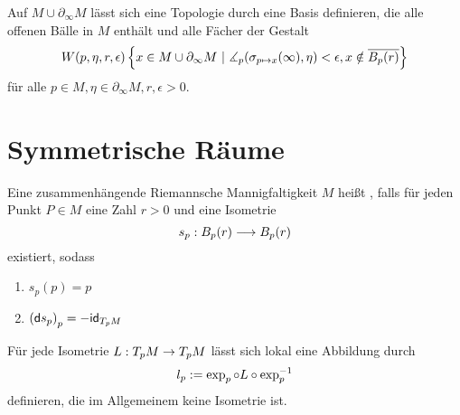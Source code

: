 \documentclass{book}
\renewcommand{\d}{\textsf{d}}
\renewcommand{\l}[1]{\overline{#1}}
\begin{document}
\Bem{}
Auf $M\cup \partial_\infty M$ lässt sich eine Topologie durch eine Basis definieren, die alle offenen Bälle in $M$ enthält und alle Fächer der Gestalt
\[ W(p,\eta, r, \epsilon)\set{x \in M \cup \partial_\infty M}{ \measuredangle_p(\sigma_{p\mapsto x}(\infty), \eta) < \epsilon, x \notin \l{B_p(r)} } \]
für alle $p \in M, \eta \in \partial_\infty M, r, \epsilon > 0$.



\newpage
\section{Symmetrische Räume}
Eine zusammenhängende Riemannsche Mannigfaltigkeit $M$ heißt , falls für jeden Punkt $P \in M$ eine Zahl $r > 0$ und eine Isometrie
\[ s_p : B_p(r) \overset{}{\longrightarrow} B_p(r) \]
existiert, sodass
\begin{enumerate}[1.)]
\item $s_p(p) = p$
\item $\klam{\d s_p}_{p} = - \id{T_pM}$
\end{enumerate}

\Bem{}
Für jede Isometrie $L : T_pM \overset{}{\rightarrow} T_pM$ lässt sich lokal eine Abbildung durch
\[ l_p := \exp_p \circ L \circ \exp_{p}^{-1} \]
definieren, die im Allgemeinem keine Isometrie ist.
\end{document}
